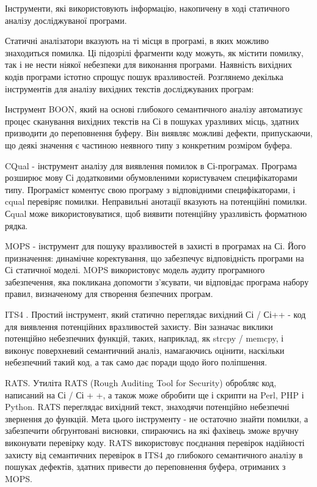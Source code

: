 Інструменти, які використовують інформацію, накопичену в ході статичного аналізу досліджуваної програми.

Статичні аналізатори вказують на ті місця в програмі, в яких можливо знаходиться помилка. Ці підозрілі фрагменти коду можуть, як містити помилку, так і не нести ніякої небезпеки для виконання програми. Наявність вихідних кодів програми істотно спрощує пошук вразливостей.
Розглянемо декілька інструментів для аналізу вихідних текстів досліджуваних програм:

Інструмент BOON, який на основі глибокого семантичного аналізу автоматизує процес сканування вихідних текстів на Сі в пошуках уразливих місць, здатних призводити до переповнення буферу. Він виявляє можливі дефекти, припускаючи, що деякі значення є частиною неявного типу з конкретним розміром буфера.

CQual - інструмент аналізу для виявлення помилок в Сі-програмах. Програма розширює мову Сі додатковими обумовленими користувачем специфікаторами типу. Програміст коментує свою програму з відповідними специфікаторами, і cqual перевіряє помилки. Неправильні анотації вказують на потенційні помилки. Сqual може використовуватися, щоб виявити потенційну уразливість форматною рядка.

MOPS - інструмент для пошуку вразливостей в захисті в програмах на Сі. Його призначення: динамічне коректування, що забезпечує відповідність програми на Сі статичної моделі. MOPS використовує модель аудиту програмного забезпечення, яка покликана допомогти з'ясувати, чи відповідає програма набору правил, визначеному для створення безпечних програм.

ITS4 . Простий інструмент, який статично переглядає вихідний Сі / Сі++ - код для виявлення потенційних вразливостей захисту. Він зазначає виклики потенційно небезпечних функцій, таких, наприклад, як strcpy / memcpy, і виконує поверхневий семантичний аналіз, намагаючись оцінити, наскільки небезпечний такий код, а так само дає поради щодо його поліпшення.

RATS. Утиліта RATS (Rough Auditing Tool for Security) обробляє код, написаний на Сі / Сі + +, а також може обробити ще і скрипти на Perl, PHP і Python. RATS переглядає вихідний текст, знаходячи потенційно небезпечні звернення до функцій. Мета цього інструменту - не остаточно знайти помилки, а забезпечити обгрунтовані висновки, спираючись на які фахівець зможе вручну виконувати перевірку коду. RATS використовує поєднання перевірок надійності захисту від семантичних перевірок в ITS4 до глибокого семантичного аналізу в пошуках дефектів, здатних привести до переповнення буфера, отриманих з MOPS.

